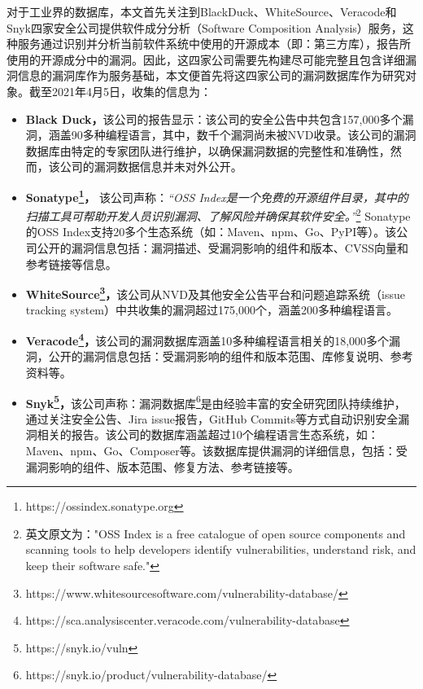 对于工业界的数据库，本文首先关注到BlackDuck\cite{blackduck}、WhiteSource\cite{whitesource}、Veracode\cite{veracode}和Snyk\cite{snyk}四家安全公司提供软件成分分析（Software Composition Analysis）服务，这种服务通过识别并分析当前软件系统中使用的开源成本（即：第三方库），报告所使用的开源成分中的漏洞。因此，这四家公司需要先构建尽可能完整且包含详细漏洞信息的漏洞库作为服务基础，本文便首先将这四家公司的漏洞数据库作为研究对象。截至2021年4月5日，收集的信息为：

\begin{itemize}[leftmargin=*]
\item\textbf{Black Duck，}该公司的报告显示：该公司的安全公告中共包含157,000多个漏洞，涵盖90多种编程语言，其中，数千个漏洞尚未被NVD收录。该公司的漏洞数据库由特定的专家团队进行维护，以确保漏洞数据的完整性和准确性，然而，该公司的漏洞数据信息并未对外公开。
\item\textbf{Sonatype\footnote{https://ossindex.sonatype.org}，} 该公司声称：\textit{“OSS Index是一个免费的开源组件目录，其中的扫描工具可帮助开发人员识别漏洞、了解风险并确保其软件安全。”}\footnote{英文原文为："OSS Index is a free catalogue of open source components and scanning tools to help developers identify vulnerabilities, understand risk, and keep their software safe."} Sonatype的OSS Index支持20多个生态系统（如：Maven、npm、Go、PyPI等）。该公司公开的漏洞信息包括：漏洞描述、受漏洞影响的组件和版本、CVSS向量和参考链接等信息。
\item\textbf{WhiteSource\footnote{https://www.whitesourcesoftware.com/vulnerability-database/}，}该公司从NVD及其他安全公告平台和问题追踪系统（issue tracking system）中共收集的漏洞超过175,000个，涵盖200多种编程语言。
\item\textbf{Veracode\footnote{https://sca.analysiscenter.veracode.com/vulnerability-database}，}该公司的漏洞数据库涵盖10多种编程语言相关的18,000多个漏洞，公开的漏洞信息包括：受漏洞影响的组件和版本范围、库修复说明、参考资料等。
\item\textbf{Snyk\footnote{https://snyk.io/vuln}，}该公司声称：漏洞数据库\footnote{https://snyk.io/product/vulnerability-database/}是由经验丰富的安全研究团队持续维护，通过关注安全公告、Jira issue报告，GitHub Commits等方式自动识别安全漏洞相关的报告。该公司的数据库涵盖超过10个编程语言生态系统，如：Maven、npm、Go、Composer等。该数据库提供漏洞的详细信息，包括：受漏洞影响的组件、版本范围、修复方法、参考链接等。
\end{itemize}

